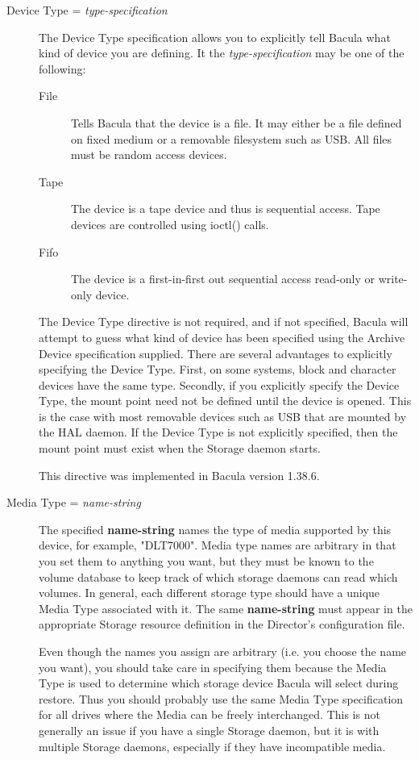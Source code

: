\begin{description}
\item [Device Type = {\it type-specification}]
   The Device Type specification allows you to explicitly tell Bacula
   what kind of device you are defining. It the {\it type-specification}
   may be one of the following:
   \begin{description}
   \item [File]
     Tells Bacula that the device is a file. It may either be a
     file defined on fixed medium or a removable filesystem such as
     USB.  All files must be random access devices.
   \item [Tape]
     The device is a tape device and thus is sequential access. Tape devices
     are controlled using ioctl() calls.
   \item [Fifo]
     The device is a first-in-first out sequential access read-only 
     or write-only device.
  \end{description}
  
  The Device Type directive is not required, and if not specified, Bacula
  will attempt to guess what kind of device has been specified using the
  Archive Device specification supplied. There are several advantages to
  explicitly specifying the Device Type. First, on some systems, block and
  character devices have the same type.
  Secondly, if you explicitly specify the Device Type, the mount point
  need not be defined until the device is opened. This is the case with
  most removable devices such as USB that are mounted by the HAL daemon.
  If the Device Type is not explicitly specified, then the mount point
  must exist when the Storage daemon starts.

  This directive was implemented in Bacula version 1.38.6.


\item [Media Type = {\it name-string}]
   The specified {\bf name-string} names the type of media supported by this
   device, for example, "DLT7000".  Media type names are arbitrary in that you
   set them to anything you want, but they must be known to the volume
   database to keep track of which storage daemons can read which volumes.  In
   general, each different storage type should have a unique Media Type
   associated with it.  The same {\bf name-string} must appear in the
   appropriate Storage resource definition in the Director's configuration
   file.
   
   Even though the names you assign are arbitrary (i.e.  you choose the name
   you want), you should take care in specifying them because the Media Type
   is used to determine which storage device Bacula will select during
   restore.  Thus you should probably use the same Media Type specification
   for all drives where the Media can be freely interchanged.  This is not
   generally an issue if you have a single Storage daemon, but it is with
   multiple Storage daemons, especially if they have incompatible media.
   

\end{description}
